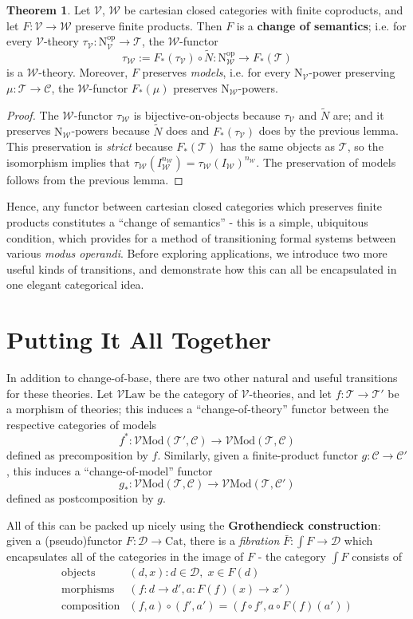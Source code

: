 \documentclass[a4paper,UKenglish]{article}
\theoremstyle{definition}
\newtheorem{theorem}{Theorem}
\newcommand{\Cat}{\mathrm{Cat}}
\newcommand{\Mod}{\mathrm{Mod}}
\newcommand{\op}{\mathrm{op}}
\newcommand{\NN}{\mathrm{N}}
\newcommand{\V}{\mathscr{V}}
\newcommand{\W}{\mathscr{W}}
\newcommand{\D}{\mathscr{D}}
\newcommand{\C}{\mathscr{C}}
\newcommand{\T}{\mathscr{T}}
\begin{document}
\begin{theorem}
	Let $\V$, $\W$ be cartesian closed categories with finite coproducts, and let $F: \V \to \W$ preserve finite products. Then $F$ is a \textbf{change of semantics}; i.e. for every $\V$-theory $\tau_\V: \NN_\V^\op \to \T$, the $\W$-functor $$\tau_\W := F_*(\tau_\V) \circ \tilde{N}: \NN_\W^\op \to F_*(\T)$$ is a $\W$-theory. Moreover, $F$ preserves \textit{models}, i.e. for every $\NN_\V$-power preserving $\mu:\T \to \C$, the $\W$-functor $F_*(\mu)$ preserves $\NN_\W$-powers.
\end{theorem}
\begin{proof}
	The $\W$-functor $\tau_\W$ is bijective-on-objects because $\tau_\V$ and $\tilde{N}$ are; and it preserves $\NN_\W$-powers because $\tilde{N}$ does and $F_*(\tau_\V)$ does by the previous lemma. This preservation is \textit{strict} because $F_*(\T)$ has the same objects as $\T$, so the isomorphism implies that $\tau_\W(I_\W^{n_\W}) = \tau_\W(I_\W)^{n_\W}$. The preservation of models follows from the previous lemma.
\end{proof}

Hence, any functor between cartesian closed categories which preserves finite products constitutes a ``change of semantics'' - this is a simple, ubiquitous condition, which provides for a method of transitioning formal systems between various \textit{modus operandi}. Before exploring applications, we introduce two more useful kinds of transitions, and demonstrate how this can all be encapsulated in one elegant categorical idea.

\section{Putting It All Together}

In addition to change-of-base, there are two other natural and useful transitions for these theories. Let $\V\mathrm{Law}$ be the category of $\V$-theories, and let $f:\T\to \T'$ be a morphism of theories; this induces a ``change-of-theory'' functor between the respective categories of models $$f^*:\V\Mod(\T',\C)\to \V\Mod(\T,\C)$$ defined as precomposition by $f$. Similarly, given a finite-product functor $g: \C \to \C'$, this induces a ``change-of-model'' functor $$g_*:\V\Mod(\T,\C) \to \V\Mod(\T,\C')$$ defined as postcomposition by $g$.

All of this can be packed up nicely using the \textbf{Grothendieck construction}: given a (pseudo)functor $F: \D \to \Cat$, there is a \textit{fibration} $\bar{F}: \int F \to \D$ which encapsulates all of the categories in the image of $F$ - the category $\int F$ consists of
\[\begin{array}{rl}
\text{objects} & (d,x) : d\in \D, \; x\in F(d)\\
\text{morphisms} & (f:d\to d',a:F(f)(x)\to x')\\
\text{composition} & (f,a) \circ (f',a') = (f \circ f', a \circ F(f)(a'))\\
\end{array}
\]
\end{document}
